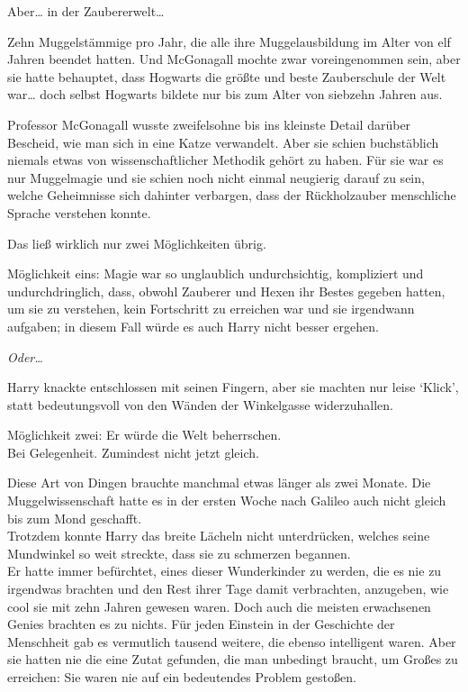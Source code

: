 {Aber… in der Zaubererwelt…

Zehn Muggelstämmige pro Jahr, die alle ihre Muggelausbildung im Alter von elf Jahren beendet hatten. Und McGonagall mochte zwar voreingenommen sein, aber sie hatte behauptet, dass Hogwarts die größte und beste Zauberschule der Welt war… doch selbst Hogwarts bildete nur bis zum Alter von siebzehn Jahren aus.

Professor McGonagall wusste zweifelsohne bis ins kleinste Detail darüber Bescheid, wie man sich in eine Katze verwandelt. Aber sie schien buchstäblich niemals etwas von wissenschaftlicher Methodik gehört zu haben. Für sie war es nur Muggelmagie und sie schien noch nicht einmal neugierig darauf zu sein, welche Geheimnisse sich dahinter verbargen, dass der Rückholzauber menschliche Sprache verstehen konnte.

Das ließ wirklich nur zwei Möglichkeiten übrig.

Möglichkeit eins: Magie war so unglaublich undurchsichtig, kompliziert und undurchdringlich, dass, obwohl Zauberer und Hexen ihr Bestes gegeben hatten, um sie zu verstehen, kein Fortschritt zu erreichen war und sie irgendwann aufgaben; in diesem Fall würde es auch Harry nicht besser ergehen.

\emph{Oder…}

Harry knackte entschlossen mit seinen Fingern, aber sie machten nur leise `Klick', statt bedeutungsvoll von den Wänden der Winkelgasse widerzuhallen.

Möglichkeit zwei: Er würde die Welt beherrschen.\\ Bei Gelegenheit. Zumindest nicht jetzt gleich.

Diese Art von Dingen brauchte manchmal etwas länger als zwei Monate. Die Muggelwissenschaft hatte es in der ersten Woche nach Galileo auch nicht gleich bis zum Mond geschafft.\\ Trotzdem konnte Harry das breite Lächeln nicht unterdrücken, welches seine Mundwinkel so weit streckte, dass sie zu schmerzen begannen.\\ Er hatte immer befürchtet, eines dieser Wunderkinder zu werden, die es nie zu irgendwas brachten und den Rest ihrer Tage damit verbrachten, anzugeben, wie cool sie mit zehn Jahren gewesen waren. Doch auch die meisten erwachsenen Genies brachten es zu nichts. Für jeden Einstein in der Geschichte der Menschheit gab es vermutlich tausend weitere, die ebenso intelligent waren. Aber sie hatten nie die eine Zutat gefunden, die man unbedingt braucht, um Großes zu erreichen: Sie waren nie auf ein bedeutendes Problem gestoßen.

}
